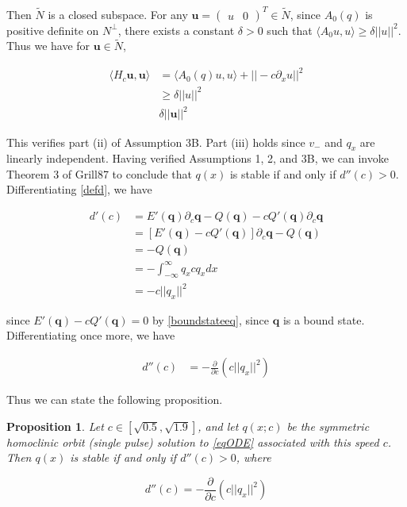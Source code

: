 \documentclass[12pt]{article}
\newtheorem{proposition}{Proposition}
\begin{document}
Then $\tilde{N}$ is a closed subspace. For any $\textbf{u} = \begin{pmatrix}u & 0\end{pmatrix}^T \in \tilde{N}$, since $A_0(q)$ is positive definite on $N^\perp$, there exists a constant $\delta > 0$ such that $\langle A_0 u, u \rangle \geq \delta ||u||^2$. Thus we have for $\textbf{u} \in \tilde{N}$,

\begin{align*}
\langle H_c \textbf{u}, \textbf{u} \rangle 
&= \langle A_0(q) u, u \rangle + || -c \partial_x u||^2 \\
&\geq \delta ||u||^2\\
&\delta ||\textbf{u}||^2
\end{align*}

This verifies part (ii) of Assumption 3B. Part (iii) holds since $v_-$ and $q_x$ are linearly independent. Having verified Assumptions 1, 2, and 3B, we can invoke Theorem 3 of Grill87 to conclude that $q(x)$ is stable if and only if $d''(c) > 0$. Differentiating \eqref{defd}, we have

\begin{align*}
d'(c) &= E'(\textbf{q})\partial_c \textbf{q} - Q(\textbf{q}) - c Q'(\textbf{q}) \partial_c \textbf{q} \\
&= [E'(\textbf{q}) - c Q'(\textbf{q})]\partial_c \textbf{q} - Q(\textbf{q}) \\
&= - Q(\textbf{q}) \\
&= -\int_{-\infty}^\infty q_x c q_x dx \\
&= -c ||q_x||^2
\end{align*}

since $E'(\textbf{q}) - c Q'(\textbf{q}) = 0$ by \eqref{boundstateeq}, since $\textbf{q}$ is a bound state. Differentiating once more, we have

\begin{align*}
d''(c) &= -\frac{\partial}{\partial c} \left( c ||q_x||^2 \right)
\end{align*}

Thus we can state the following proposition.

\begin{proposition}\label{stabcrit}
Let $c \in [\sqrt{0.5}, \sqrt{1.9}]$, and let $q(x; c)$ be the symmetric homoclinic orbit (single pulse) solution to \eqref{eqODE} associated with this speed $c$. Then $q(x)$ is stable if and only if $d''(c) > 0$, where

\begin{equation}\label{dcc}
d''(c) = -\frac{\partial}{\partial c} \left( c ||q_x||^2 \right)
\end{equation}
\end{proposition}
\end{document}
